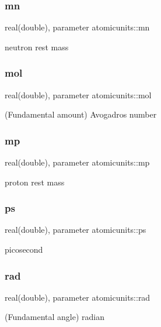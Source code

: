 \subsubsection{\texorpdfstring{mn}{mn}}
{\footnotesize\ttfamily real(double), parameter atomicunits\+::mn}



neutron rest mass 

\mbox{\label{namespaceatomicunits_af00d60f8fc301784d6e48a53e524a4c8}} 
\subsubsection{\texorpdfstring{mol}{mol}}
{\footnotesize\ttfamily real(double), parameter atomicunits\+::mol}



(Fundamental amount) Avogadro\textquotesingle{}s number 

\mbox{\label{namespaceatomicunits_a62f37608529c74a442a81baa515965d6}} 
\subsubsection{\texorpdfstring{mp}{mp}}
{\footnotesize\ttfamily real(double), parameter atomicunits\+::mp}



proton rest mass 

\mbox{\label{namespaceatomicunits_af5dac3bb123ac05a538d6ebd2373eb3b}} 
\subsubsection{\texorpdfstring{ps}{ps}}
{\footnotesize\ttfamily real(double), parameter atomicunits\+::ps}



picosecond 

\mbox{\label{namespaceatomicunits_a07ac069b1a5417fd61aa3954d6b66d83}} 
\subsubsection{\texorpdfstring{rad}{rad}}
{\footnotesize\ttfamily real(double), parameter atomicunits\+::rad}



(Fundamental angle) radian 

